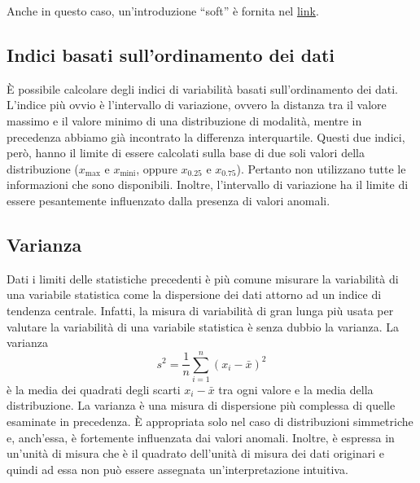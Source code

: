 \documentclass[
  10pt,
  italian,
  a4paper,
  extrafontsizes,onecolumn,openright
  ]{memoir}
\theoremstyle{definition}
\theoremstyle{definition}
\theoremstyle{definition}
\theoremstyle{definition}
\theoremstyle{remark}
\begin{document}
Anche in questo caso, un'introduzione ``soft'' è fornita nel \href{https://tinystats.github.io/teacups-giraffes-and-statistics/04_variance.html}{link}.

\hypertarget{indici-basati-sullordinamento-dei-dati}{%
\subsection{Indici basati sull'ordinamento dei dati}\label{indici-basati-sullordinamento-dei-dati}}

È possibile calcolare degli indici di variabilità basati
sull'ordinamento dei dati. L'indice più ovvio è l'intervallo di
variazione, ovvero la distanza tra il valore massimo e il valore minimo
di una distribuzione di modalità, mentre in precedenza abbiamo già
incontrato la differenza interquartile. Questi due indici, però, hanno
il limite di essere calcolati sulla base di due soli valori della
distribuzione (\(x_{\text{max}}\) e \(x_{\text{mini}}\), oppure \(x_{0.25}\) e
\(x_{0.75}\)). Pertanto non utilizzano tutte le informazioni che sono
disponibili. Inoltre, l'intervallo di variazione ha il limite di essere
pesantemente influenzato dalla presenza di valori anomali.

\hypertarget{varianza}{%
\subsection{Varianza}\label{varianza}}

Dati i limiti delle statistiche precedenti è più comune misurare la
variabilità di una variabile statistica come la dispersione dei dati
attorno ad un indice di tendenza centrale. Infatti, la misura di variabilità di gran lunga più usata per valutare la variabilità di una variabile statistica è senza dubbio la varianza. La varianza
\begin{equation}
s^2 = \frac{1}{n} \sum_{i=1}^n (x_i - \bar{x})^2
\label{eq:var-descr}
\end{equation}
è la media dei quadrati degli scarti \(x_i - \bar{x}\) tra ogni valore e la media della distribuzione.
La varianza è una misura di dispersione più complessa di quelle esaminate in precedenza. È appropriata solo nel caso di distribuzioni simmetriche e, anch'essa, è fortemente influenzata dai valori anomali. Inoltre, è espressa in un'unità di misura che è il quadrato dell'unità di misura dei dati originari e quindi ad essa non può essere assegnata un'interpretazione intuitiva.
\end{document}
